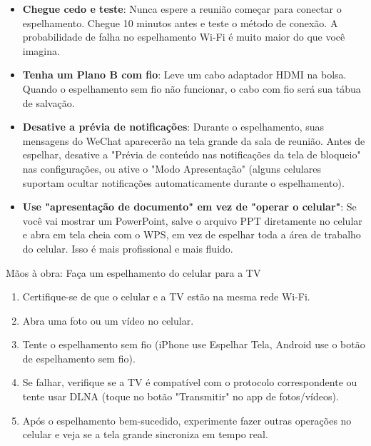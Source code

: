 \begin{itemize}
  \item \textbf{Chegue cedo e teste}: Nunca espere a reunião começar para conectar o espelhamento. Chegue 10 minutos antes e teste o método de conexão. A probabilidade de falha no espelhamento Wi-Fi é muito maior do que você imagina.
  \item \textbf{Tenha um Plano B com fio}: Leve um cabo adaptador HDMI na bolsa. Quando o espelhamento sem fio não funcionar, o cabo com fio será sua tábua de salvação.
  \item \textbf{Desative a prévia de notificações}: Durante o espelhamento, suas mensagens do WeChat aparecerão na tela grande da sala de reunião. Antes de espelhar, desative a "Prévia de conteúdo nas notificações da tela de bloqueio" nas configurações, ou ative o "Modo Apresentação" (alguns celulares suportam ocultar notificações automaticamente durante o espelhamento).
  \item \textbf{Use "apresentação de documento" em vez de "operar o celular"}: Se você vai mostrar um PowerPoint, salve o arquivo PPT diretamente no celular e abra em tela cheia com o WPS, em vez de espelhar toda a área de trabalho do celular. Isso é mais profissional e mais fluido.
\end{itemize}

\begin{tcbpractice}{Mãos à obra: Faça um espelhamento do celular para a TV}
\begin{enumerate}
  \item Certifique-se de que o celular e a TV estão na mesma rede Wi-Fi.
  \item Abra uma foto ou um vídeo no celular.
  \item Tente o espelhamento sem fio (iPhone use Espelhar Tela, Android use o botão de espelhamento sem fio).
  \item Se falhar, verifique se a TV é compatível com o protocolo correspondente ou tente usar DLNA (toque no botão "Transmitir" no app de fotos/vídeos).
  \item Após o espelhamento bem-sucedido, experimente fazer outras operações no celular e veja se a tela grande sincroniza em tempo real.
\end{enumerate}

\end{tcbpractice}

